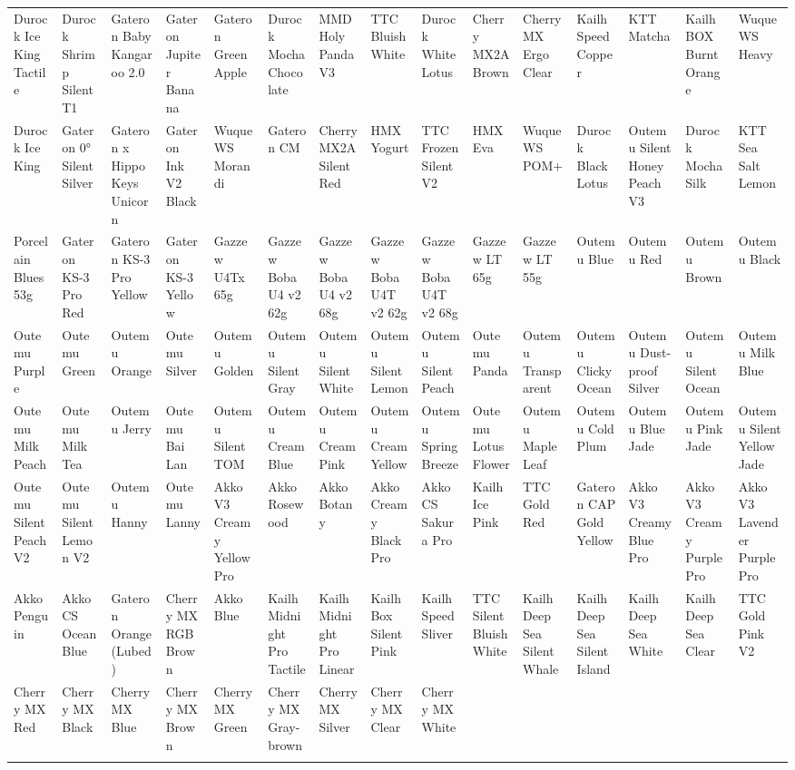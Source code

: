 \documentclass[a4paper]{article}
\begin{document}
\pagestyle{empty}
\begin{center}
\fontsize{7}{9}\selectfont
{\selectfont
\begin{tabular}{ : *{15}{C{1.2cm}:} }
\hdashline
Durock Ice King Tactile & Durock Shrimp Silent T1 & Gateron Baby Kangaroo 2.0 & Gateron Jupiter Banana & Gateron Green Apple & Durock Mocha Chocolate & MMD Holy Panda V3 & TTC Bluish White & Durock White Lotus & Cherry MX2A Brown & Cherry MX Ergo Clear & Kailh Speed Copper & KTT Matcha & Kailh BOX Burnt Orange & Wuque WS Heavy \\ 
\hdashline
Durock Ice King & Gateron 0° Silent Silver & Gateron x HippoKeys Unicorn & Gateron Ink V2 Black & Wuque WS Morandi & Gateron CM & Cherry MX2A Silent Red & HMX Yogurt & TTC Frozen Silent V2 & HMX Eva & Wuque WS POM+ & Durock Black Lotus & Outemu Silent Honey Peach V3 & Durock Mocha Silk & KTT Sea Salt Lemon \\ 
\hdashline
Porcelain Blues 53g & Gateron KS-3 Pro Red & Gateron KS-3 Pro Yellow & Gateron KS-3 Yellow & Gazzew U4Tx 65g & Gazzew Boba U4 v2 62g & Gazzew Boba U4 v2 68g & Gazzew Boba U4T v2 62g & Gazzew Boba U4T v2 68g & Gazzew LT 65g & Gazzew LT 55g & Outemu Blue & Outemu Red & Outemu Brown & Outemu Black \\ 
\hdashline
Outemu Purple & Outemu Green & Outemu Orange & Outemu Silver & Outemu Golden & Outemu Silent Gray & Outemu Silent White & Outemu Silent Lemon & Outemu Silent Peach & Outemu Panda & Outemu Transparent & Outemu Clicky Ocean & Outemu Dust-proof Silver & Outemu Silent Ocean & Outemu Milk Blue \\ 
\hdashline
Outemu Milk Peach & Outemu Milk Tea & Outemu Jerry & Outemu Bai Lan & Outemu Silent TOM & Outemu Cream Blue & Outemu Cream Pink & Outemu Cream Yellow & Outemu Spring Breeze & Outemu Lotus Flower & Outemu Maple Leaf & Outemu Cold Plum & Outemu Blue Jade & Outemu Pink Jade & Outemu Silent Yellow Jade \\ 
\hdashline
Outemu Silent Peach V2 & Outemu Silent Lemon V2 & Outemu Hanny & Outemu Lanny & Akko V3 Creamy Yellow Pro & Akko Rosewood & Akko Botany & Akko Creamy Black Pro & Akko CS Sakura Pro & Kailh Ice Pink & TTC Gold Red & Gateron CAP Gold Yellow & Akko V3 Creamy Blue Pro & Akko V3 Creamy Purple Pro & Akko V3 Lavender Purple Pro \\ 
\hdashline
Akko Penguin & Akko CS Ocean Blue & Gateron Orange (Lubed) & Cherry MX RGB Brown & Akko Blue & Kailh Midnight Pro Tactile & Kailh Midnight Pro Linear & Kailh Box Silent Pink & Kailh Speed Sliver & TTC Silent Bluish White & Kailh Deep Sea Silent Whale & Kailh Deep Sea Silent Island & Kailh Deep Sea White & Kailh Deep Sea Clear & TTC Gold Pink V2 \\ 
\hdashline
Cherry MX Red & Cherry MX Black & Cherry MX Blue & Cherry MX Brown & Cherry MX Green & Cherry MX Gray-brown & Cherry MX Silver & Cherry MX Clear & Cherry MX White &  &  &  &  &  &  \\ 
\hdashline
\end{tabular}
}
\end{center}
\end{document}
